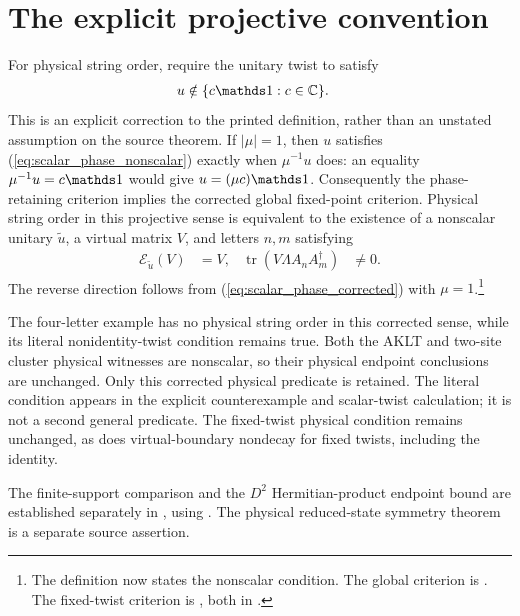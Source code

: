 \documentclass[11pt]{article}
\begin{document}
\section{The explicit projective convention}

For physical string order, require the unitary twist to satisfy
\begin{align}
 u&\notin\{c\Id:c\in\C\}.
 \label{eq:scalar_phase_nonscalar}
\end{align}
This is an explicit correction to the printed definition, rather than an
unstated assumption on the source theorem. If $|\mu|=1$, then $u$ satisfies
(\ref{eq:scalar_phase_nonscalar}) exactly when $\mu^{-1}u$ does: an equality
$\mu^{-1}u=c\Id$ would give $u=(\mu c)\Id$.
Consequently the phase-retaining criterion implies the corrected global
fixed-point criterion. Physical string order in this projective sense is
equivalent to the existence of a nonscalar unitary $\widetilde u$, a virtual
matrix $V$, and letters $n,m$ satisfying
\begin{align}
 \mathcal E_{\widetilde u}(V)&=V,
 &\operatorname{tr}(V\Lambda A_nA_m^\dagger)&\ne0.
 \label{eq:scalar_phase_projective_fixed}
\end{align}
The reverse direction follows from (\ref{eq:scalar_phase_corrected}) with
$\mu=1$.\footnote{The definition
 now states the nonscalar condition.
The global criterion is
.
The fixed-twist criterion is
,
both in .}

The four-letter example has no physical string order in this corrected
sense, while its literal nonidentity-twist condition remains true.
Both the AKLT and two-site cluster physical witnesses are nonscalar, so their
physical endpoint conclusions are unchanged. Only this corrected physical
predicate is retained. The literal condition appears in the explicit
counterexample and scalar-twist calculation; it is not a second general
predicate. The fixed-twist physical condition remains unchanged, as does
virtual-boundary nondecay for fixed twists, including the identity.

The finite-support comparison and the $D^2$ Hermitian-product endpoint bound
are established separately in
, using
.
The physical reduced-state symmetry theorem is a separate source assertion.



\end{document}
